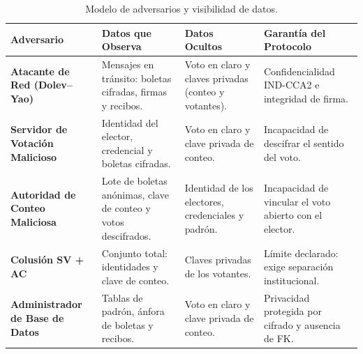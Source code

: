 \begin{table}[!htbp]
\centering
\renewcommand{\arraystretch}{1.22}
\footnotesize
\begin{tabularx}{\textwidth}{|>{\bfseries}p{3.0cm}|>{\raggedright\arraybackslash}p{3.4cm}|>{\raggedright\arraybackslash}p{3.6cm}|>{\raggedright\arraybackslash}X|}
\hline
\textbf{Adversario} & \textbf{Datos que Observa} & \textbf{Datos Ocultos} & \textbf{Garantía del Protocolo} \\
\hline
Atacante de Red (Dolev--Yao) & Mensajes en tránsito: boletas cifradas, firmas y recibos. & Voto en claro y claves privadas (conteo y votantes). & Confidencialidad IND-CCA2 e integridad de firma. \\
\hline
Servidor de Votación Malicioso & Identidad del elector, credencial y boletas cifradas. & Voto en claro y clave privada de conteo. & Incapacidad de descifrar el sentido del voto. \\
\hline
Autoridad de Conteo Maliciosa & Lote de boletas anónimas, clave de conteo y votos descifrados. & Identidad de los electores, credenciales y padrón. & Incapacidad de vincular el voto abierto con el elector. \\
\hline
Colusión SV + AC & Conjunto total: identidades y clave de conteo. & Claves privadas de los votantes. & Límite declarado: exige separación institucional. \\
\hline
Administrador de Base de Datos & Tablas de padrón, ánfora de boletas y recibos. & Voto en claro y clave privada de conteo. & Privacidad protegida por cifrado y ausencia de FK. \\
\hline
\end{tabularx}
\caption{Modelo de adversarios y visibilidad de datos.}
\label{tab:modelo_adversarios}
\par{}
\end{table}
